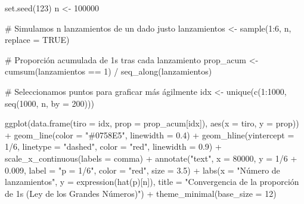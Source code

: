 \documentclass[
  spanish,
  letterpaper,
  DIV=11,
  numbers=noendperiod]{scrartcl}
\newenvironment{Shaded}{\begin{snugshade}}{\end{snugshade}}
\newcommand{\AttributeTok}[1]{\textcolor[rgb]{0.40,0.45,0.13}{#1}}
\newcommand{\CommentTok}[1]{\textcolor[rgb]{0.37,0.37,0.37}{#1}}
\newcommand{\ConstantTok}[1]{\textcolor[rgb]{0.56,0.35,0.01}{#1}}
\newcommand{\DecValTok}[1]{\textcolor[rgb]{0.68,0.00,0.00}{#1}}
\newcommand{\FloatTok}[1]{\textcolor[rgb]{0.68,0.00,0.00}{#1}}
\newcommand{\FunctionTok}[1]{\textcolor[rgb]{0.28,0.35,0.67}{#1}}
\newcommand{\NormalTok}[1]{\textcolor[rgb]{0.00,0.23,0.31}{#1}}
\newcommand{\OtherTok}[1]{\textcolor[rgb]{0.00,0.23,0.31}{#1}}
\newcommand{\SpecialCharTok}[1]{\textcolor[rgb]{0.37,0.37,0.37}{#1}}
\newcommand{\StringTok}[1]{\textcolor[rgb]{0.13,0.47,0.30}{#1}}
\begin{document}
\begin{Shaded}
\begin{Highlighting}[]
\FunctionTok{set.seed}\NormalTok{(}\DecValTok{123}\NormalTok{)}
\NormalTok{n }\OtherTok{\textless{}{-}} \DecValTok{100000}

\CommentTok{\# Simulamos n lanzamientos de un dado justo}
\NormalTok{lanzamientos }\OtherTok{\textless{}{-}} \FunctionTok{sample}\NormalTok{(}\DecValTok{1}\SpecialCharTok{:}\DecValTok{6}\NormalTok{, n, }\AttributeTok{replace =} \ConstantTok{TRUE}\NormalTok{)}

\CommentTok{\# Proporción acumulada de 1s tras cada lanzamiento}
\NormalTok{prop\_acum }\OtherTok{\textless{}{-}} \FunctionTok{cumsum}\NormalTok{(lanzamientos }\SpecialCharTok{==} \DecValTok{1}\NormalTok{) }\SpecialCharTok{/} \FunctionTok{seq\_along}\NormalTok{(lanzamientos)}

\CommentTok{\# Seleccionamos puntos para graficar más ágilmente}
\NormalTok{idx }\OtherTok{\textless{}{-}} \FunctionTok{unique}\NormalTok{(}\FunctionTok{c}\NormalTok{(}\DecValTok{1}\SpecialCharTok{:}\DecValTok{1000}\NormalTok{, }\FunctionTok{seq}\NormalTok{(}\DecValTok{1000}\NormalTok{, n, }\AttributeTok{by =} \DecValTok{200}\NormalTok{)))}

\FunctionTok{ggplot}\NormalTok{(}\FunctionTok{data.frame}\NormalTok{(}\AttributeTok{tiro =}\NormalTok{ idx, }\AttributeTok{prop =}\NormalTok{ prop\_acum[idx]),}
       \FunctionTok{aes}\NormalTok{(}\AttributeTok{x =}\NormalTok{ tiro, }\AttributeTok{y =}\NormalTok{ prop)) }\SpecialCharTok{+}
  \FunctionTok{geom\_line}\NormalTok{(}\AttributeTok{color =} \StringTok{"\#0758E5"}\NormalTok{, }\AttributeTok{linewidth =} \FloatTok{0.4}\NormalTok{) }\SpecialCharTok{+}
  \FunctionTok{geom\_hline}\NormalTok{(}\AttributeTok{yintercept =} \DecValTok{1}\SpecialCharTok{/}\DecValTok{6}\NormalTok{, }\AttributeTok{linetype =} \StringTok{"dashed"}\NormalTok{,}
             \AttributeTok{color =} \StringTok{"red"}\NormalTok{, }\AttributeTok{linewidth =} \FloatTok{0.9}\NormalTok{) }\SpecialCharTok{+}
  \FunctionTok{scale\_x\_continuous}\NormalTok{(}\AttributeTok{labels =}\NormalTok{ comma) }\SpecialCharTok{+}
  \FunctionTok{annotate}\NormalTok{(}\StringTok{"text"}\NormalTok{, }\AttributeTok{x =} \DecValTok{80000}\NormalTok{, }\AttributeTok{y =} \DecValTok{1}\SpecialCharTok{/}\DecValTok{6} \SpecialCharTok{+} \FloatTok{0.009}\NormalTok{,}
           \AttributeTok{label =} \StringTok{"p = 1/6"}\NormalTok{, }\AttributeTok{color =} \StringTok{"red"}\NormalTok{, }\AttributeTok{size =} \FloatTok{3.5}\NormalTok{) }\SpecialCharTok{+}
  \FunctionTok{labs}\NormalTok{(}\AttributeTok{x =} \StringTok{"Número de lanzamientos"}\NormalTok{,}
       \AttributeTok{y =} \FunctionTok{expression}\NormalTok{(}\FunctionTok{hat}\NormalTok{(p)[n]),}
       \AttributeTok{title =} \StringTok{"Convergencia de la proporción de 1s (Ley de los Grandes Números)"}\NormalTok{) }\SpecialCharTok{+}
  \FunctionTok{theme\_minimal}\NormalTok{(}\AttributeTok{base\_size =} \DecValTok{12}\NormalTok{)}
\end{Highlighting}
\end{Shaded}
\end{document}

